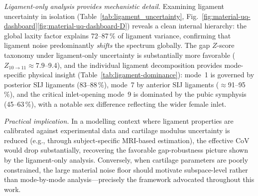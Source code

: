 \documentclass[11pt]{article}
\begin{document}
\emph{Ligament-only analysis provides mechanistic detail.}
Examining ligament uncertainty in isolation (Table~\ref{tab:ligament_uncertainty}, Fig.~\ref{fig:material-uq-dashboard}\ref{fig:material-uq-dashboard-D}) reveals a clean internal hierarchy: the global laxity factor explains 72--87\,\% of ligament variance, confirming that ligament noise predominantly \emph{shifts} the spectrum globally.
The gap $Z$-score taxonomy under ligament-only uncertainty is substantially more favorable ($Z_{10{\to}11} \approx 7.9$--9.4), and the individual ligament decomposition provides mode-specific physical insight (Table~\ref{tab:ligament-dominance}): mode~1 is governed by posterior SIJ ligaments (83--88\,\%), mode~7 by anterior SIJ ligaments ($\approx$91--95\,\%), and the critical inlet-opening mode~9 is dominated by the pubic symphysis (45--63\,\%), with a notable sex difference reflecting the wider female inlet.

\emph{Practical implication.}
In a modelling context where ligament properties are calibrated against experimental data and cartilage modulus uncertainty is reduced (e.g., through subject-specific MRI-based estimation), the effective CoV would drop substantially, recovering the favorable gap-robustness picture shown by the ligament-only analysis.
Conversely, when cartilage parameters are poorly constrained, the large material noise floor should motivate subspace-level rather than mode-by-mode analysis---precisely the framework advocated throughout this work.
\end{document}
